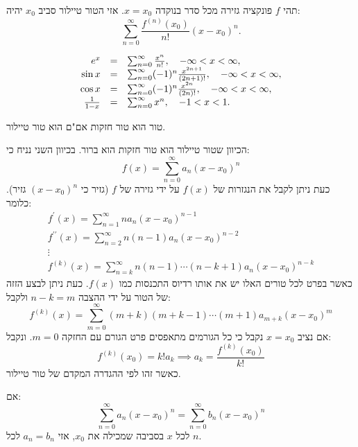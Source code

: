 \documentclass{tstextbook}
\begin{document}
\begin{definition}
תהי \(f\) פונקציה גזירה מכל סדר בנוקדה \(x=x_{0}\). אזי הטור טיילור סביב \(x_{0}\) יהיה:
$$\sum_{n=0}^{\infty}\frac{f^{(n)}(x_{0})}{n!}(x-x_{0})^{n}.$$

\end{definition}
\begin{example}
$$\begin{array}{r c l}{{e^{x}}}&{{=}}&{{\sum_{n=0}^{\infty}\frac{x^{n}}{n!},\quad-\infty<x<\infty,}}\\ {{\sin x}}&{{=}}&{{\sum_{n=0}^{\infty}(-1)^{n}\frac{x^{2n+1}}{(2n+1)!},\quad-\infty<x<\infty,}}\\ {{\cos x}}&{{=}}&{{\sum_{n=0}^{\infty}(-1)^{n}\frac{x^{2n}}{(2n)!},\quad-\infty<x<\infty,}}\\ {{\frac{1}{1-x}}}&{{=}}&{{\sum_{n=0}^{\infty}x^{n},\quad-1<x<1.}}\end{array}$$

\end{example}
\begin{proposition}
טור הוא טור חזקות אם"ם הוא טור טיילור.

\end{proposition}
\begin{definition}
הכיוון שטור טיילור הוא טור חזקות הוא ברור. בכיוון השני נניח כי:
$$f(x)=\sum_{n=0}^{\infty}a_{n}(x-x_{0})^{n}$$
כעת ניתן לקבל את הנגזרות של \(f(x)\) על ידי גזירה של \(f\) (גזיר כי \((x-x_{0})^{n}\) גזיר). כלומר:
$$\begin{gather}f^{\prime}(x)=\sum_{n=1}^{\infty}na_{n}(x-x_{0})^{n-1}\\f^{\prime\prime}(x)=\sum_{n=2}^{\infty}n(n-1)a_{n}(x-x_{0})^{n-2}\\ \vdots \\f^{(k)}(x)=\sum_{n=k}^{\infty}n(n-1)\cdots(n-k+1)a_{n}(x-x_{0})^{n-k} 
\end{gather}$$
כאשר בפרט לכל טורים האלו יש את אותו רדיוס התכנסות כמו \(f(x)\). כעת ניתן לבצע הזזה של הטור על ידי ההצבה \(n-k=m\) ולקבל:
$$f^{(k)}(x)=\sum_{m=0}^{\infty}(m+k)(m+k-1)\cdots(m+1)a_{m+k}(x-x_{0})^{m}$$
אם נציב \(x=x_{0}\) נקבל כי כל הגורמים מתאפסים פרט הגורם עם החזקה \(m=0\). ונקבל:
$$f^{(k)}(x_{0})=k!a_{k}\implies a_{k}=\frac{f^{(k)}(x_{0})}{k!}$$
כאשר זהו לפי ההגדרה המקדם של טור טיילור.

\end{definition}
\begin{proposition}
אם:
$$\sum_{n=0}^{\infty}a_{n}(x-x_{0})^{n}=\sum_{n=0}^{\infty}b_{n}(x-x_{0})^{n}$$
לכל \(x\) בסביבה שמכילה את \(x_{0}\), אזי \(a_{n}=b_{n}\) לכל \(n\).

\end{proposition}
\end{document}
